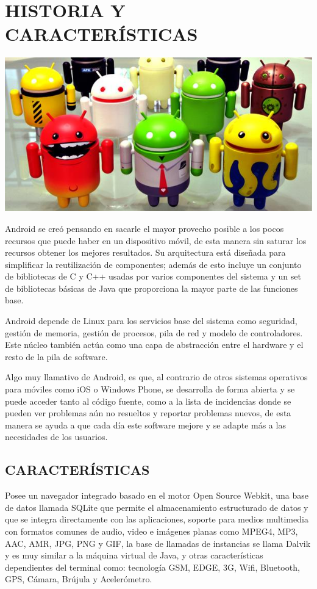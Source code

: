 \section*{HISTORIA Y CARACTERÍSTICAS}
\includegraphics[scale=0.7]{img/cp05/img0503.png}

Android se creó pensando en sacarle el mayor provecho posible a los pocos recursos que puede haber en un dispositivo móvil, de esta manera sin saturar los recursos obtener los 
mejores resultados. Su arquitectura está diseñada para simplificar la reutilización de componentes; además de esto incluye un conjunto de bibliotecas de C y C++ usadas por varios 
componentes del sistema y un set de bibliotecas básicas de Java que proporciona la mayor parte de las funciones base.

Android depende de Linux para los servicios base del sistema como seguridad, gestión de memoria, gestión de procesos, pila de red y modelo de controladores. Este núcleo también 
actúa como una capa de abstracción entre el hardware y el resto de la pila de software.

Algo muy llamativo de Android, es que, al contrario de otros sistemas operativos para móviles como iOS o Windows Phone, se desarrolla de forma abierta y se puede acceder tanto al 
código fuente, como a la lista de incidencias donde se pueden ver problemas aún no resueltos y reportar problemas nuevos, de esta manera se ayuda a que cada día este software 
mejore y se adapte más a las necesidades de los usuarios.

\subsection*{CARACTERÍSTICAS}
Posee un navegador integrado basado en el motor Open Source Webkit, una base de datos llamada SQLite que permite el almacenamiento estructurado de datos y que se integra 
directamente con las aplicaciones, soporte para medios multimedia con formatos comunes de audio, video e imágenes planas como MPEG4, MP3, AAC, AMR, JPG, PNG y GIF, la base de 
llamadas de instancias se llama Dalvik y es muy similar a la máquina virtual de Java, y otras características dependientes del terminal como: tecnología GSM, EDGE, 3G, Wifi, 
Bluetooth, GPS, Cámara, Brújula y Acelerómetro.

